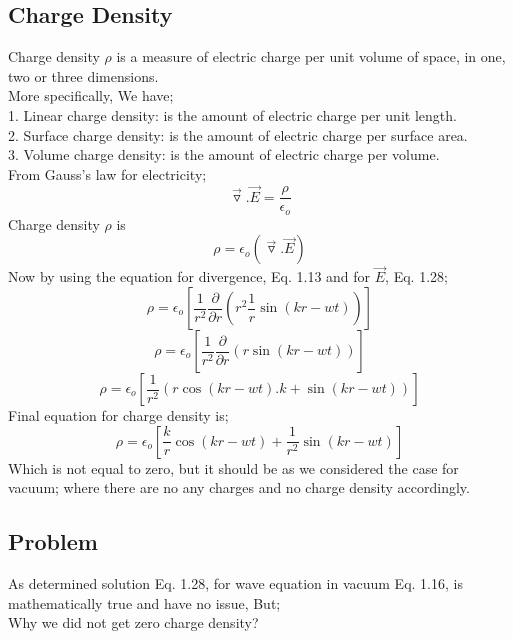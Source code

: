 \documentclass[a4paper, twoside] {thesis}
\begin{document}
\subsection{Charge Density}
Charge density $\rho$ is a measure of electric charge per unit volume of space, in one, two or three dimensions.\\
More specifically, We have;\\
1. Linear charge density: is the amount of electric charge per unit length.\\
2. Surface charge density: is the amount of electric charge per surface area.\\
3. Volume charge density: is the amount of electric charge per volume.\\
From Gauss's law for electricity;\\
\begin{equation}
\vec{\triangledown}.\vec{E} = \frac{\rho}{\epsilon_{o}}
\end{equation}
Charge density $\rho$ is\\
\begin{equation}
\rho = {\epsilon_{o}}(\vec{\triangledown}.\vec{E})
\end{equation}
Now by using the equation for divergence, Eq. 1.13 and for $\vec{E}$, Eq. 1.28;\\
\begin{equation}
\rho = {\epsilon_{o}}[\frac{1}{r^2}\frac{\partial}{\partial r}(r^2\frac{1}{r}\sin(kr-wt))]
\end{equation}
\begin{equation}
\rho = {\epsilon_{o}}[\frac{1}{r^2}\frac{\partial}{\partial r}(r\sin(kr-wt))]
\end{equation}
\begin{equation}
\rho = {\epsilon_{o}}[\frac{1}{r^2}(r\cos(kr-wt).k+\sin(kr-wt))]
\end{equation}
Final equation for charge density is;\\
\begin{equation}
\rho = {\epsilon_{o}}[\frac{k}{r}\cos(kr-wt)+\frac{1}{r^2}\sin(kr-wt)]
\end{equation}
Which is not equal to zero, but it should be as we considered the case for vacuum; where there are no any charges and no charge density accordingly.\\

\subsection{Problem}
As determined solution Eq. 1.28, for wave equation in vacuum Eq. 1.16, is mathematically true and have no issue, But;\\
Why we did not get zero charge density?
\end{document}
